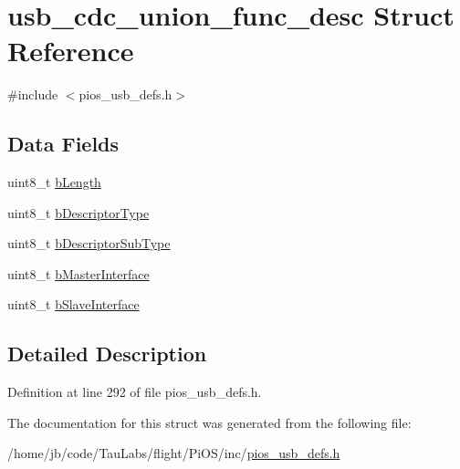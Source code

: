 \hypertarget{structusb__cdc__union__func__desc}{\section{usb\-\_\-cdc\-\_\-union\-\_\-func\-\_\-desc \-Struct \-Reference}
\label{structusb__cdc__union__func__desc}
}


{\ttfamily \#include $<$pios\-\_\-usb\-\_\-defs.\-h$>$}

\subsection*{\-Data \-Fields}
\begin{DoxyCompactItemize}
\item 
uint8\-\_\-t \hyperlink{group___p_i_o_s___u_s_b___d_e_f_s_ga2175f86e94200d579781fa41c37c9bc1}{b\-Length}
\item 
uint8\-\_\-t \hyperlink{group___p_i_o_s___u_s_b___d_e_f_s_ga1f7c70ea92f6b53756b96cb3b3d791c6}{b\-Descriptor\-Type}
\item 
uint8\-\_\-t \hyperlink{group___p_i_o_s___u_s_b___d_e_f_s_ga5784c9fea0c30db9be3ed5d38e02c4b7}{b\-Descriptor\-Sub\-Type}
\item 
uint8\-\_\-t \hyperlink{group___p_i_o_s___u_s_b___d_e_f_s_ga9194ac785cd0cc798e0a438dbcab9062}{b\-Master\-Interface}
\item 
uint8\-\_\-t \hyperlink{group___p_i_o_s___u_s_b___d_e_f_s_ga9cfe098c280a95412143266a948eb290}{b\-Slave\-Interface}
\end{DoxyCompactItemize}


\subsection{\-Detailed \-Description}


\-Definition at line 292 of file pios\-\_\-usb\-\_\-defs.\-h.



\-The documentation for this struct was generated from the following file\-:\begin{DoxyCompactItemize}
\item 
/home/jb/code/\-Tau\-Labs/flight/\-Pi\-O\-S/inc/\hyperlink{pios__usb__defs_8h}{pios\-\_\-usb\-\_\-defs.\-h}\end{DoxyCompactItemize}
